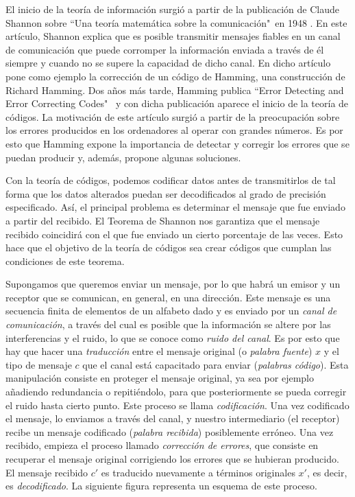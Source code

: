 El inicio de la teoría de información surgió a partir de la publicación de Claude Shannon sobre ``Una teoría matemática sobre la comunicación"\ en 1948 \cite{Shannon_1948}. En este artículo, Shannon explica que es posible transmitir mensajes fiables en un canal de comunicación que puede corromper la información enviada a través de él siempre y cuando no se supere la capacidad de dicho canal. En dicho artículo pone como ejemplo la corrección de un código de Hamming, una construcción de Richard Hamming. Dos años más tarde, Hamming publica ``Error Detecting and Error Correcting Codes"\ \cite{Hamming_1950} y con dicha publicación aparece el inicio de la teoría de códigos. La motivación de este artículo surgió a partir de la preocupación sobre los errores producidos en los ordenadores al operar con grandes números. Es por esto que Hamming expone la importancia de detectar y corregir los errores que se puedan producir y, además, propone algunas soluciones.

Con la teoría de códigos, podemos codificar datos antes de transmitirlos de tal forma que los datos alterados puedan ser decodificados al grado de precisión especificado. Así, el principal problema es determinar el mensaje que fue enviado a partir del recibido. El Teorema de Shannon nos garantiza que el mensaje recibido coincidirá con el que fue enviado un cierto porcentaje de las veces. Esto hace que el objetivo de la teoría de códigos sea crear códigos que cumplan las condiciones de este teorema.

Supongamos que queremos enviar un mensaje, por lo que habrá un emisor y un receptor que se comunican, en general, en una dirección. Este mensaje es una secuencia finita de elementos de un alfabeto dado y es enviado por un \emph{canal de comunicación}, a través del cual es posible que la información se altere por las interferencias y el ruido, lo que se conoce como \emph{ruido del canal}. Es por esto que hay que hacer una \emph{traducción} entre el mensaje original (o \emph{palabra fuente}) $x$ y el tipo de mensaje $c$ que el canal está capacitado para enviar (\emph{palabras código}). Esta manipulación consiste en proteger el mensaje original, ya sea por ejemplo añadiendo redundancia o repitiéndolo, para que posteriormente se pueda corregir el ruido hasta cierto punto. Este proceso se llama \emph{codificación}. Una vez codificado el mensaje, lo enviamos a través del canal, y nuestro intermediario (el receptor) recibe un mensaje codificado (\emph{palabra recibida}) posiblemente erróneo. Una vez recibido, empieza el proceso llamado \emph{corrección de errores}, que consiste en recuperar el mensaje original corrigiendo los errores que se hubieran producido. El mensaje recibido $c'$ es traducido nuevamente a términos originales $x'$, es decir, es \emph{decodificado}. La siguiente figura representa un esquema de este proceso.


